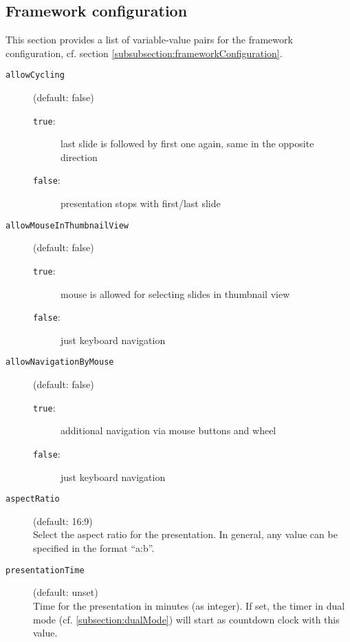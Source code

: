 \documentclass{scrartcl}
\newcommand{\code}[1]{{\tt #1}}
\begin{document}
\pagebreak
\begin{appendix}


\section{Framework configuration}
\label{sec:frameworkConfiguration}


This section provides a list of variable-value pairs for the framework configuration, cf. section \ref{subsubsection:frameworkConfiguration}.

\begin{description}
\item[\code{allowCycling}] (default: false)
  \begin{description}
  \item[\code{true}:] last slide is followed by first one again, same in the opposite direction
  \item[\code{false}:] presentation stops with first/last slide
  \end{description}

\item[\code{allowMouseInThumbnailView}] (default: false)
  \begin{description}
  \item[\code{true}:] mouse is allowed for selecting slides in thumbnail view
  \item[\code{false}:] just keyboard navigation
  \end{description}


\item[\code{allowNavigationByMouse}] (default: false)
  \begin{description}
  \item[\code{true}:] additional navigation via mouse buttons and wheel
  \item[\code{false}:] just keyboard navigation
  \end{description}

\item[\code{aspectRatio}] (default: 16:9)\\Select the aspect ratio for the presentation. In general, any value can be specified in the format ``a:b''.

\item[\code{presentationTime}] (default: unset)\\Time for the presentation in minutes (as integer). If set, the timer in dual mode (cf. \ref{subsection:dualMode}) will start as countdown clock with this value.
\end{description}



\end{appendix}
\end{document}
